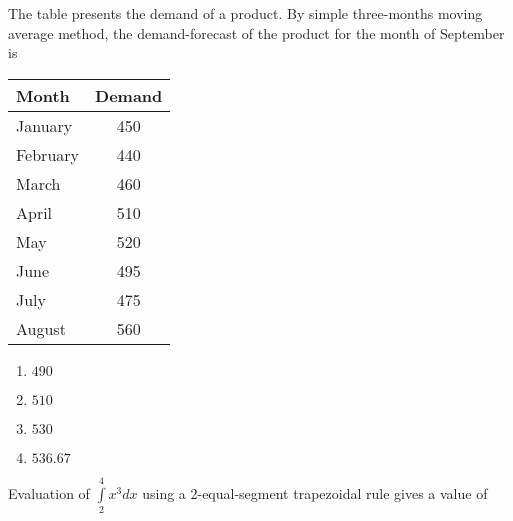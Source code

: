 \iffalse
\chapter{2019}
\author{EE24BTECH11019 - Dwarak A}
\section{me}
\fi

    \item The table presents the demand of a product. By simple three-months moving average method, the demand-forecast of the product for the month of September is
        \begin{table}[!ht]
            \centering
            \begin{tabular}{|l|c|}
\hline
Month    & Demand \\
\hline
January  & 450    \\
\hline
February & 440    \\
\hline
March    & 460    \\
\hline
April    & 510    \\
\hline
May      & 520    \\
\hline
June     & 495    \\
\hline
July     & 475    \\
\hline
August   & 560    \\
\hline

\end{tabular}
        \end{table}
        \begin{enumerate}
            \item $490$
            \item $510$
            \item $530$
            \item $536.67$
        \end{enumerate}

    \item Evaluation of $\int\limits_2^4x^3dx$ using a 2-equal-segment trapezoidal rule gives a value of \underline{\hspace{1cm}}
    
